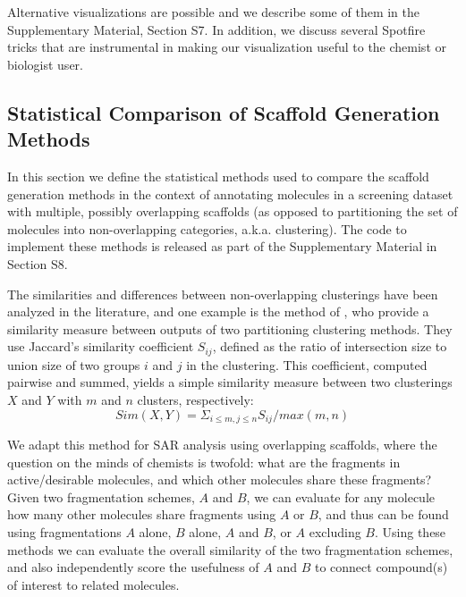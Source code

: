 \documentclass[journal=jacsat,manuscript=article]{achemso}
\begin{document}
Alternative visualizations are possible and we describe some of them
in the Supplementary Material, Section S7. In addition, we discuss several
Spotfire tricks that are instrumental in making our visualization
useful to the chemist or biologist
user. %

\subsection{Statistical Comparison of Scaffold Generation Methods}
\label{sec:statmethod}
In this section we define the statistical methods used to compare the
scaffold generation methods in the context of annotating molecules in
a screening dataset with multiple, possibly overlapping scaffolds (as
opposed to partitioning the set of molecules into non-overlapping
categories, a.k.a. clustering). The code to implement these methods is released
as part of the Supplementary Material in Section S8.

The similarities and differences between non-overlapping clusterings
have been analyzed in the literature, and one example is the method of
\citet{Torres2009}, who provide a similarity measure between
outputs of two partitioning clustering methods. They use Jaccard's
similarity coefficient $S_{ij}$, defined as the ratio of intersection
size to union size of two groups $i$ and $j$ in the clustering.  This
coefficient, computed pairwise and summed, yields a simple similarity
measure between two clusterings $X$ and $Y$ with $m$ and $n$ clusters,
respectively:
\begin{equation}
Sim(X,Y) = \Sigma_{i \le m, j \le n}{S_{ij} / max(m,n)}
\end{equation}

We adapt this method for SAR analysis using overlapping scaffolds,
where the question on the minds of chemists is twofold: what are the
fragments in active/desirable molecules, and which other molecules
share these fragments? Given two fragmentation schemes, $A$ and $B$,
we can evaluate for any molecule how many other molecules share
fragments using $A$ or $B$, and thus can be found using fragmentations
$A$ alone, $B$ alone, $A$ and $B$, or $A$ excluding $B$.  Using these
methods we can evaluate the overall similarity of the two
fragmentation schemes, and also independently score the usefulness of
$A$ and $B$ to connect compound(s) of interest to related molecules. 
\end{document}
